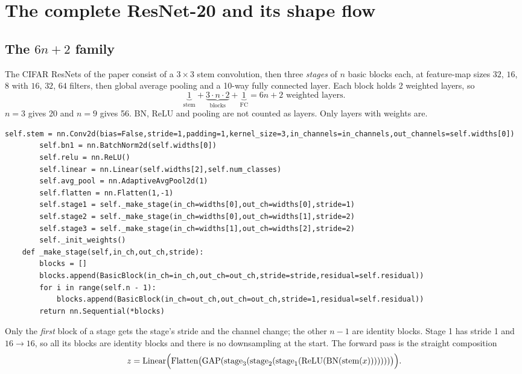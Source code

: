 \section{The complete ResNet-20 and its shape flow}
\label{sec:arch}

\subsection{The $6n+2$ family}

\begin{idea}
The CIFAR ResNets of the paper consist of a $3{\times}3$ stem convolution, then three \emph{stages} of $n$ basic blocks each, at feature-map sizes $32$, $16$, $8$ with $16$, $32$, $64$ filters, then global average pooling and a 10-way fully connected layer. Each block holds 2 weighted layers, so
\[
  \underbrace{1}_{\text{stem}} + \underbrace{3\cdot n\cdot 2}_{\text{blocks}} + \underbrace{1}_{\text{FC}} = 6n+2 \text{ weighted layers.}
\]
$n=3$ gives 20 and $n=9$ gives 56. BN, ReLU and pooling are not counted as layers. Only layers with weights are.
\end{idea}

\begin{repo}[\texttt{ResNetCIFAR(n, residual=True, num\_classes=10, in\_channels=3, widths=(16,32,64))}]
\begin{lstlisting}[firstnumber=45]
        self.stem = nn.Conv2d(bias=False,stride=1,padding=1,kernel_size=3,in_channels=in_channels,out_channels=self.widths[0])
        self.bn1 = nn.BatchNorm2d(self.widths[0])
        self.relu = nn.ReLU()
        self.linear = nn.Linear(self.widths[2],self.num_classes)
        self.avg_pool = nn.AdaptiveAvgPool2d(1)
        self.flatten = nn.Flatten(1,-1)
        self.stage1 = self._make_stage(in_ch=widths[0],out_ch=widths[0],stride=1)
        self.stage2 = self._make_stage(in_ch=widths[0],out_ch=widths[1],stride=2)
        self.stage3 = self._make_stage(in_ch=widths[1],out_ch=widths[2],stride=2)
        self._init_weights()
    def _make_stage(self,in_ch,out_ch,stride):
        blocks = []
        blocks.append(BasicBlock(in_ch=in_ch,out_ch=out_ch,stride=stride,residual=self.residual))
        for i in range(self.n - 1):
            blocks.append(BasicBlock(in_ch=out_ch,out_ch=out_ch,stride=1,residual=self.residual))
        return nn.Sequential(*blocks)
\end{lstlisting}
Only the \emph{first} block of a stage gets the stage's stride and the channel change; the other $n-1$ are identity blocks. Stage 1 has stride 1 and $16\to16$, so all its blocks are identity blocks and there is no downsampling at the start. The forward pass is the straight composition
\[
  z = \text{Linear}\Big(\text{Flatten}\big(\text{GAP}(\text{stage}_3(\text{stage}_2(\text{stage}_1(\operatorname{ReLU}(\operatorname{BN}(\text{stem}(x)))))))\big)\Big).
\]
\end{repo}

